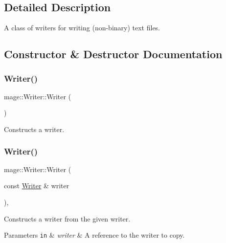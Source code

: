 \subsection{Detailed Description}
A class of writers for writing (non-\/binary) text files. 

\subsection{Constructor \& Destructor Documentation}
\mbox{\label{classmage_1_1_writer_a40b6cd3005d509e670c5a49272d9ef27}} 
\subsubsection{\texorpdfstring{Writer()}{Writer()}\hspace{0.1cm}{\footnotesize\ttfamily [1/3]}}
{\footnotesize\ttfamily mage\+::\+Writer\+::\+Writer (\begin{DoxyParamCaption}{ }\end{DoxyParamCaption})\hspace{0.3cm}{\ttfamily [protected]}}

Constructs a writer. \mbox{\label{classmage_1_1_writer_a2b257938508732ca0b78241aafa7922c}} 
\subsubsection{\texorpdfstring{Writer()}{Writer()}\hspace{0.1cm}{\footnotesize\ttfamily [2/3]}}
{\footnotesize\ttfamily mage\+::\+Writer\+::\+Writer (\begin{DoxyParamCaption}\item[{const \mbox{\hyperlink{classmage_1_1_writer}{Writer}} \&}]{writer }\end{DoxyParamCaption})\hspace{0.3cm}{\ttfamily [protected]}, {\ttfamily [delete]}}

Constructs a writer from the given writer.


\begin{DoxyParams}[1]{Parameters}
\mbox{\tt in}  & {\em writer} & A reference to the writer to copy. \\
\hline
\end{DoxyParams}
\mbox{\label{classmage_1_1_writer_abda6f6db577201580c0e97c0816e0d3f}} 
